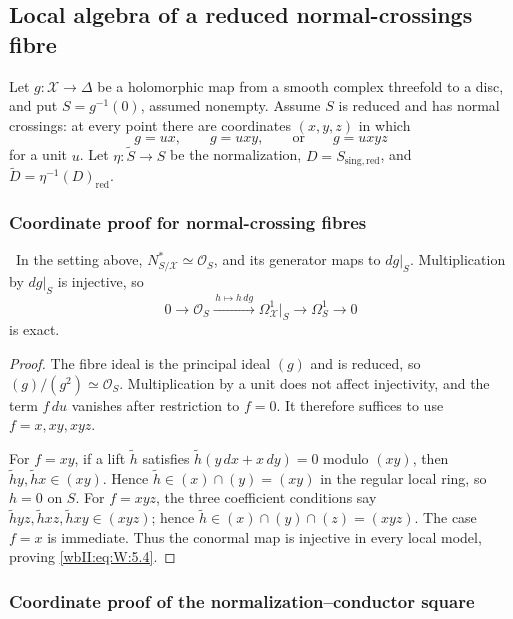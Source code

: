 \subsection{Local algebra of a reduced normal-crossings fibre}

Let $g:\mathcal X\to\Delta$ be a holomorphic map from a smooth complex
threefold to a disc, and put $S=g^{-1}(0)$, assumed nonempty.  Assume $S$ is reduced and has
normal crossings: at every point there are coordinates $(x,y,z)$ in which
\[
g=ux,\qquad g=uxy,\qquad\text{or}\qquad g=uxyz
\tag{W.3}\label{wbII:eq:W:5.3}
\]
for a unit $u$.  Let $\eta:\widetilde S\to S$ be the normalization,
$D=S_{\mathrm{sing,red}}$, and $\widetilde D=\eta^{-1}(D)_{\mathrm{red}}$.

\subsubsection*{Coordinate proof for normal-crossing fibres}

\ In the setting above, $N^*_{S/\mathcal X}\simeq\mathcal O_S$,
and its generator maps to $dg|_S$.  Multiplication by $dg|_S$ is injective,
so
\[
0\longrightarrow\mathcal O_S
\xrightarrow{\,h\mapsto h\,dg\,}
\Omega^1_{\mathcal X}|_S\longrightarrow\Omega^1_S\longrightarrow0
\tag{W.4}\label{wbII:eq:W:5.4}
\]
is exact.



\begin{proof}
The fibre ideal is the principal ideal $(g)$ and is reduced, so
$(g)/(g^2)\simeq\mathcal O_S$.  Multiplication by a unit does not affect
injectivity, and the term $f\,du$ vanishes after restriction to $f=0$.
It therefore suffices to use $f=x,xy,xyz$.

For $f=xy$, if a lift $\widetilde h$ satisfies
$\widetilde h(y\,dx+x\,dy)=0$ modulo $(xy)$, then
$\widetilde h y,\widetilde h x\in(xy)$.  Hence
$\widetilde h\in(x)\cap(y)=(xy)$ in the regular local ring, so $h=0$ on
$S$.  For $f=xyz$, the three coefficient conditions say
$\widetilde h yz,\widetilde h xz,\widetilde h xy\in(xyz)$; hence
$\widetilde h\in(x)\cap(y)\cap(z)=(xyz)$.  The case $f=x$ is immediate.
Thus the conormal map is injective in every local model, proving \eqref{wbII:eq:W:5.4}.
\end{proof}

\subsubsection*{Coordinate proof of the normalization--conductor square}


